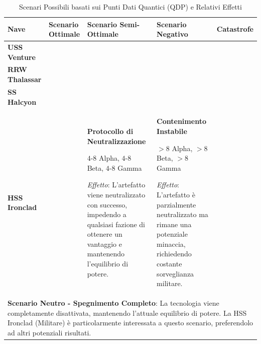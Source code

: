 \documentclass[letterpaper,twocolumn,openany,nodeprecatedcode]{dndbook}
\begin{document}
\begin{landscape}

\begin{table}[htbp]
\centering
\caption{Scenari Possibili basati sui Punti Dati Quantici (QDP) e Relativi Effetti}
\small
\begin{tabular}{|p{2.3cm}|p{4cm}|p{4cm}|p{4cm}|p{4cm}|}
\hline
\textbf{Nave} & \textbf{Scenario Ottimale} & \textbf{Scenario Semi-Ottimale} & \textbf{Scenario Negativo} & \textbf{Catastrofe} \\ 
\hline
\textbf{USS Venture} & 

& 

& 

& 

\\ 
\hline
\textbf{RRW Thalassar} & 

& 

& 

& 

\\ 
\hline
\textbf{SS Halcyon} & 

& 

& 

& 

\\ 
\hline
\textbf{HSS Ironclad} & 

& 
\textbf{Protocollo di Neutralizzazione}

$4$-$8$ Alpha, $4$-$8$ Beta, $4$-$8$ Gamma

\textit{Effetto}: L'artefatto viene neutralizzato con successo, impedendo a qualsiasi fazione di ottenere un vantaggio e mantenendo l'equilibrio di potere.
& 
\textbf{Contenimento Instabile}

$>8$ Alpha, $>8$ Beta, $>8$ Gamma

\textit{Effetto}: L'artefatto è parzialmente neutralizzato ma rimane una potenziale minaccia, richiedendo costante sorveglianza militare.
& 

\\ 
\hline
\multicolumn{5}{|p{18.3cm}|}{\textbf{Scenario Neutro - Spegnimento Completo}: La tecnologia viene completamente disattivata, mantenendo l'attuale equilibrio di potere. La HSS Ironclad (Militare) è particolarmente interessata a questo scenario, preferendolo ad altri potenziali risultati.} \\
\hline
\end{tabular}
\end{table}
\end{landscape}
\end{document}
